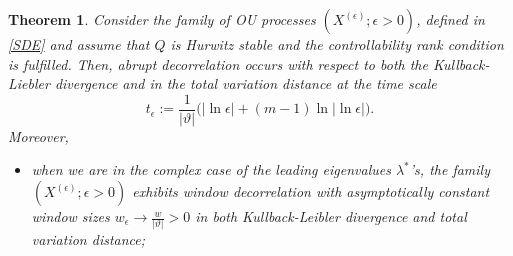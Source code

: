 \documentclass[12pt,thmsa]{article}
\newtheorem{theorem}{Theorem}
\begin{document}
\begin{theorem}\label{theorem2}  
Consider the family of OU processes $(X^{(\epsilon)}; \epsilon>0)$, defined in \eqref{SDE} and assume that  $Q$ is Hurwitz stable and the controllability rank condition is fulfilled. Then, abrupt decorrelation occurs with respect to both the  Kullback-Liebler divergence and in the total variation distance at the time scale
$$  t_\epsilon:=\frac{1}{|\vartheta|}\Big(|\ln \epsilon|+\left(m-1\right)\ln|\ln \epsilon|\Big).$$  Moreover,
\begin{itemize}
	\item[i)] when we are in the complex case of the leading eigenvalues $\lambda^*$'s, the family $(X^{(\epsilon)}; \epsilon>0)$ exhibits
	window decorrelation with asymptotically constant window sizes $w_\epsilon\to \frac{w}{|\vartheta|}>0$ in both Kullback-Leibler divergence and total variation distance;
	

\end{itemize}
\end{theorem}
\end{document}

